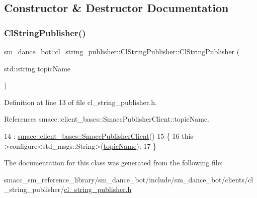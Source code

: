 \subsection{Constructor \& Destructor Documentation}
\mbox{\label{classsm__dance__bot_1_1cl__string__publisher_1_1ClStringPublisher_aee0c825fe0c073dbb5e676bb396cac39}} 
\subsubsection{\texorpdfstring{Cl\+String\+Publisher()}{ClStringPublisher()}}
{\footnotesize\ttfamily sm\+\_\+dance\+\_\+bot\+::cl\+\_\+string\+\_\+publisher\+::\+Cl\+String\+Publisher\+::\+Cl\+String\+Publisher (\begin{DoxyParamCaption}\item[{std\+::string}]{topic\+Name }\end{DoxyParamCaption})\hspace{0.3cm}{\ttfamily [inline]}}



Definition at line 13 of file cl\+\_\+string\+\_\+publisher.\+h.



References smacc\+::client\+\_\+bases\+::\+Smacc\+Publisher\+Client\+::topic\+Name.


\begin{DoxyCode}
14         : \hyperlink{classsmacc_1_1client__bases_1_1SmaccPublisherClient}{smacc::client\_bases::SmaccPublisherClient}()
15     \{
16         this->configure<std\_msgs::String>(\hyperlink{classsmacc_1_1client__bases_1_1SmaccPublisherClient_a8b8d98aef9b3b3a441005d2cb17b4fcc}{topicName});
17     \}
\end{DoxyCode}


The documentation for this class was generated from the following file\+:\begin{DoxyCompactItemize}
\item 
smacc\+\_\+sm\+\_\+reference\+\_\+library/sm\+\_\+dance\+\_\+bot/include/sm\+\_\+dance\+\_\+bot/clients/cl\+\_\+string\+\_\+publisher/\hyperlink{sm__dance__bot_2include_2sm__dance__bot_2clients_2cl__string__publisher_2cl__string__publisher_8h}{cl\+\_\+string\+\_\+publisher.\+h}\end{DoxyCompactItemize}
